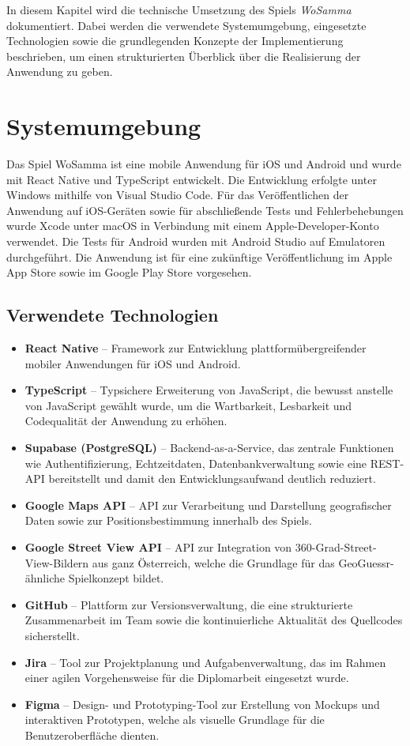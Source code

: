 In diesem Kapitel wird die technische Umsetzung des Spiels \textit{WoSamma} dokumentiert.
Dabei werden die verwendete Systemumgebung, eingesetzte Technologien sowie die grundlegenden
Konzepte der Implementierung beschrieben, um einen strukturierten Überblick über die Realisierung
der Anwendung zu geben.

\section{Systemumgebung}
Das Spiel WoSamma ist eine mobile Anwendung für iOS und Android und wurde mit React Native und TypeScript entwickelt.
Die Entwicklung erfolgte unter Windows mithilfe von Visual Studio Code.
Für das Veröffentlichen der Anwendung auf iOS-Geräten sowie für abschließende Tests und Fehlerbehebungen wurde Xcode unter macOS in Verbindung mit einem Apple-Developer-Konto verwendet.
Die Tests für Android wurden mit Android Studio auf Emulatoren durchgeführt.
Die Anwendung ist für eine zukünftige Veröffentlichung im Apple App Store sowie im Google Play Store vorgesehen.

\subsection{Verwendete Technologien}
\begin{itemize}
    \item \textbf{React Native} – Framework zur Entwicklung plattformübergreifender mobiler Anwendungen für iOS und Android.
    \item \textbf{TypeScript} – Typsichere Erweiterung von JavaScript, die bewusst anstelle von JavaScript gewählt wurde, um die Wartbarkeit, Lesbarkeit und Codequalität der Anwendung zu erhöhen.
    \item \textbf{Supabase (PostgreSQL)} – Backend-as-a-Service, das zentrale Funktionen wie Authentifizierung, Echtzeitdaten, Datenbankverwaltung sowie eine REST-API bereitstellt und damit den Entwicklungsaufwand deutlich reduziert.
    \item \textbf{Google Maps API} – API zur Verarbeitung und Darstellung geografischer Daten sowie zur Positionsbestimmung innerhalb des Spiels.
    \item \textbf{Google Street View API} – API zur Integration von 360-Grad-Street-View-Bildern aus ganz Österreich, welche die Grundlage für das GeoGuessr-ähnliche Spielkonzept bildet.
    \item \textbf{GitHub} – Plattform zur Versionsverwaltung, die eine strukturierte Zusammenarbeit im Team sowie die kontinuierliche Aktualität des Quellcodes sicherstellt.
    \item \textbf{Jira} – Tool zur Projektplanung und Aufgabenverwaltung, das im Rahmen einer agilen Vorgehensweise für die Diplomarbeit eingesetzt wurde.
    \item \textbf{Figma} – Design- und Prototyping-Tool zur Erstellung von Mockups und interaktiven Prototypen, welche als visuelle Grundlage für die Benutzeroberfläche dienten.
\end{itemize}

